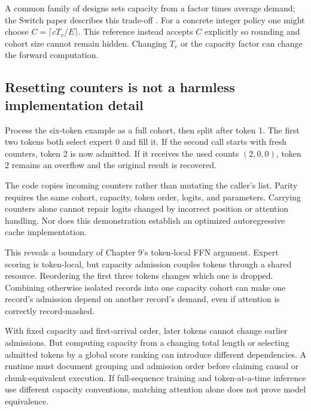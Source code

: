 A common family of designs sets capacity from a factor times average demand;
the Switch paper describes this trade-off \cite{switch}. For a concrete
integer policy one might choose $C=\lceil cT_v/E\rceil$. This reference instead
accepts $C$ explicitly so rounding and cohort size cannot remain hidden.
Changing $T_v$ or the capacity factor can change the forward computation.

\subsection{Resetting counters is not a harmless implementation detail}
Process the six-token example as a full cohort, then split after token 1. The
first two tokens both select expert 0 and fill it. If the second call starts
with fresh counters, token 2 is now admitted. If it receives the used counts
$(2,0,0)$, token 2 remains an overflow and the original result is recovered.


The code copies incoming counters rather than mutating the caller's list.
Parity requires the same cohort, capacity, token order, logits, and parameters.
Carrying counters alone cannot repair logits changed by incorrect position or
attention handling. Nor does this demonstration establish an optimized
autoregressive cache implementation.

This reveals a boundary of Chapter 9's token-local FFN argument. Expert scoring
is token-local, but capacity admission couples tokens through a shared resource.
Reordering the first three tokens changes which one is dropped. Combining
otherwise isolated records into one capacity cohort can make one record's
admission depend on another record's demand, even if attention is correctly
record-masked.

With fixed capacity and first-arrival order, later tokens cannot change earlier
admissions. But computing capacity from a changing total length or selecting
admitted tokens by a global score ranking can introduce different dependencies.
A runtime must document grouping and admission order before claiming causal
or chunk-equivalent execution. If full-sequence training and token-at-a-time
inference use different capacity conventions, matching attention alone does
not prove model equivalence.

